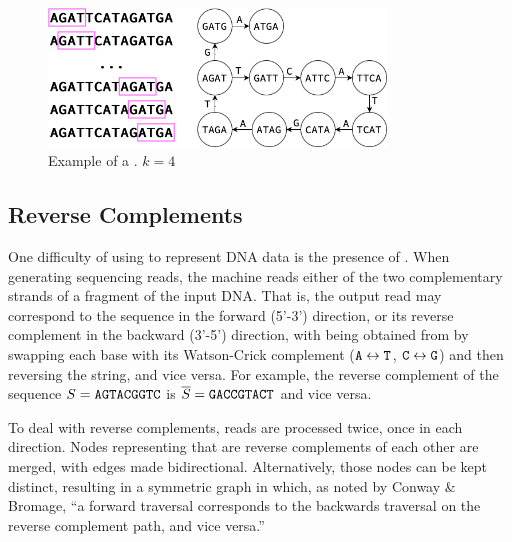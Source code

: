 \begin{figure}[htbp]
	\begin{center}
    \includegraphics[width=0.8\textwidth]{figures/dbg-example}
	\end{center}
	\caption{Example of a \dBG. $k=4$}\label{fig:dbgexample}
\end{figure}

\subsection{Reverse Complements}
\label{subsec:dBG-reversecomplements}

One difficulty of using  to represent DNA data is the presence of . When generating sequencing reads, the machine reads either of the two complementary strands of a fragment of the input DNA. That is, the output read may correspond to the sequence  in the forward (5'-3') direction, or its reverse complement  in the backward (3'-5') direction, with
 being obtained from  by swapping each base with its Watson-Crick complement
($\mathtt{A} \leftrightarrow \mathtt{T}$, $\mathtt{C} \leftrightarrow \mathtt{G}$) and then reversing the string, and vice versa. For example, the reverse complement of the sequence $S=\mathtt{AGTACGGTC}$ is $\overline{S}=\mathtt{GACCGTACT}$ and vice versa.

To deal with reverse complements, reads are processed twice, once in each direction. Nodes representing  that are reverse complements of each other are merged, with edges made bidirectional. Alternatively, those nodes can be kept distinct, resulting in a symmetric graph in which, as noted by Conway \& Bromage, ``a forward traversal corresponds to the backwards traversal on the reverse complement path, and vice versa.'' \cite{Conway2011}

